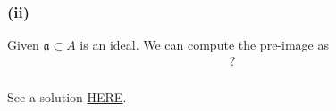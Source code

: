 \subsubsection{(ii)}
Given $\mathfrak a\subset A$ is an ideal. We can compute the pre-image as \begin{align*}
    ?
\end{align*}

\subsubsection{}

See a solution \href{http://math_research.uct.ac.za/marques/US/AMforSophiesAGSeminar.pdf}{HERE}.
